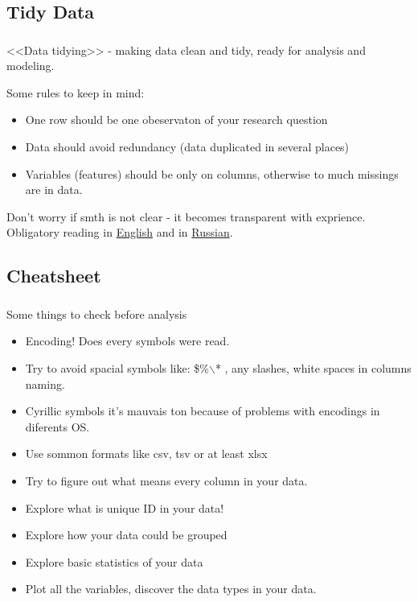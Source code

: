 \documentclass[t, 11pt]{beamer}
\begin{document}
	\subsection{Tidy Data}
	
			\begin{frame} 
		\frametitle{\insertsection} 
		\framesubtitle{\insertsubsection}
		 <<Data tidying>> - making data clean and tidy, ready for analysis and modeling. 
	 
	 Some rules to keep in mind: 
	 
	 \begin{itemize}
	 	 \item One row  should be one obeservaton of your research question
	 	 \item Data should avoid redundancy (data duplicated in several places)
	 	 \item Variables (features) should be only on columns, otherwise to much missings are in data.
	 	\end{itemize}
 	Don't worry if smth is not clear - it becomes transparent with exprience. Obligatory reading in \href{http://vita.had.co.nz/papers/tidy-data.pdf}{English} and in \href{https://habr.com/ru/post/248741/}{Russian}.
 	
	\end{frame}

	\subsection{Cheatsheet}
	\begin{frame} 
	\frametitle{\insertsection} 
	\framesubtitle{\insertsubsection}
 Some things to check before analysis
	\begin{itemize}
		\item Encoding! Does every symbols were read.
		\item Try to avoid spacial symbols like: \$\%$\backslash$* , any slashes, white spaces in columns naming. 
		\item Cyrillic symbols it's mauvais ton because of problems with encodings in diferents OS.
		\item Use sommon formats like csv, tsv or at least xlsx
		\item Try to figure out what means every column in your data.
		\item Explore what is unique ID in your data! 
		\item Explore how your data could be grouped 
		\item Explore basic statistics of your data 
		\item Plot all the variables, discover the data types in your data.
	\end{itemize}
\end{frame}
\end{document}
